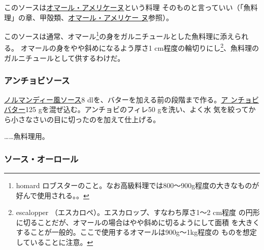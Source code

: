 \begin{recette}
このソースは\protect\hyperlink{homard-americaine}{オマール・アメリケーヌ}という料理
そのものと言っていい（「魚料理」の章、甲殻類、\protect\hyperlink{homard-americaine}{オマール・アメリケー
ヌ}参照）。

このソースは通常、オマール\footnote{homard
  ロブスターのこと。なお高級料理では800〜900g程度の大きなものが好んで使用される。。}の身をガルニチュールとした魚料理に添えられる。
オマールの身をやや斜めになるよう厚さ1 cm程度の輪切りにし\footnote{escalopper
  （エスカロペ）。エスカロップ、すなわち厚さ1〜2 cm程度
  の円形に切ることだが、オマールの場合はやや斜めに切るようにして面積
  を大きくすることが一般的。ここで使用するオマールは900g〜1kg程度の
  ものを想定していることに注意。}、魚料理の
ガルニチュールとして供するわけだ。

\maeaki

\hypertarget{sauce-anchois}{%
\subsubsection{アンチョビソース}\label{sauce-anchois}}



\href{}{ノルマンディー風ソース}8
dlを、バターを加える前の段階まで作る。\href{}{ア ンチョビバター}125
gを混ぜ込む。アンチョビのフィレ50 gを洗い、よく水
気を絞ってから小さなさいの目に切ったのを加えて仕上げる。

\ldots{}\ldots{}魚料理用。

\maeaki

\hypertarget{sauce-aurore}{%
\subsubsection{ソース・オーロール}\label{sauce-aurore}}


\end{recette}

